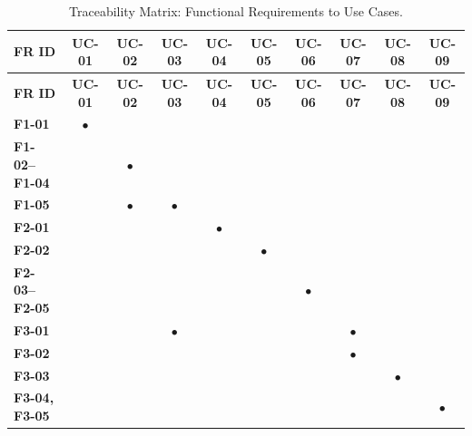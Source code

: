 \begingroup

\small

\setlength{\tabcolsep}{4pt}

\renewcommand{\arraystretch}{1.15}

\begin{longtable}{|>{\raggedright\arraybackslash}p{}|c|c|c|c|c|c|c|c|c|}

\caption{Traceability Matrix: Functional Requirements to Use Cases.}\label{tab:traceability}\\

\hline

\rowcolor{tablehead}

\textbf{FR ID} & \textbf{UC-01} & \textbf{UC-02} & \textbf{UC-03} & \textbf{UC-04} & \textbf{UC-05} & \textbf{UC-06} & \textbf{UC-07} & \textbf{UC-08} & \textbf{UC-09} \\ \hline

\endfirsthead

\hline

\rowcolor{tablehead}

\textbf{FR ID} & \textbf{UC-01} & \textbf{UC-02} & \textbf{UC-03} & \textbf{UC-04} & \textbf{UC-05} & \textbf{UC-06} & \textbf{UC-07} & \textbf{UC-08} & \textbf{UC-09} \\ \hline

\endhead

\endfoot

\endlastfoot

\textbf{F1-01} & $\bullet$ & & & & & & & & \\ \hline

\textbf{F1-02--F1-04} & & $\bullet$ & & & & & & & \\ \hline

\textbf{F1-05} & & $\bullet$ & $\bullet$ & & & & & & \\ \hline

\textbf{F2-01} & & & & $\bullet$ & & & & & \\ \hline

\textbf{F2-02} & & & & & $\bullet$ & & & & \\ \hline

\textbf{F2-03--F2-05} & & & & & & $\bullet$ & & & \\ \hline

\textbf{F3-01} & & & $\bullet$ & & & & $\bullet$ & & \\ \hline

\textbf{F3-02} & & & & & & & $\bullet$ & & \\ \hline

\textbf{F3-03} & & & & & & & & $\bullet$ & \\ \hline

\textbf{F3-04, F3-05} & & & & & & & & & $\bullet$ \\ \hline

\end{longtable}

